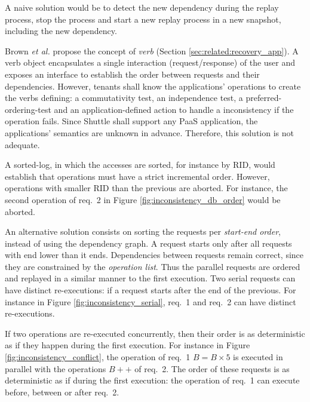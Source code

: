 A naive solution would be to detect the new dependency during the replay process, stop the process and start a new replay process in a new snapshot, including the new dependency.

Brown \textit{et al.} \cite{undoForOperators} propose the concept of \textit{verb} (Section \ref{sec:related:recovery_app}). A verb object encapsulates a single interaction (request/response) of the user and exposes an interface to establish the order between requests and their dependencies. However, tenants shall know the applications' operations to create the verbs defining: a commutativity test, an independence test, a preferred-ordering-test and an application-defined action to handle a inconsistency if the operation fails. Since Shuttle shall support any \ac{PaaS} application, the applications' semantics are unknown in advance. Therefore, this solution is not adequate.

A sorted-log, in which the accesses are sorted, for instance by \ac{RID}, would establish that operations must have a strict incremental order. However, operations with smaller \ac{RID} than the previous are aborted. For instance, the second operation of {req.~2} in Figure \ref{fig:inconsistency_db_order} would be aborted.

An alternative solution consists on sorting the requests per \emph{start-end order}, instead of using the dependency graph. A request starts only after all requests with end lower than it ends. Dependencies between requests remain correct, since they are constrained by the \emph{operation list}. Thus the parallel requests are ordered and replayed in a similar manner to the first execution. Two serial requests can have distinct re-executions: if a request starts after the end of the previous. For instance in Figure \ref{fig:inconsistency_serial}, {req.~1} and {req.~2} can have distinct re-executions.

If two operations are re-executed concurrently, then their order is as deterministic as if they happen during the first execution. For instance in Figure \ref{fig:inconsistency_conflict}, the operation of {req.~1} $B = B \times 5$ is executed in parallel with the operations $B++$ of {req.~2}. The order of these requests is as deterministic as if during the first execution: the operation of {req.~1} can execute before, between or after {req.~2}.


